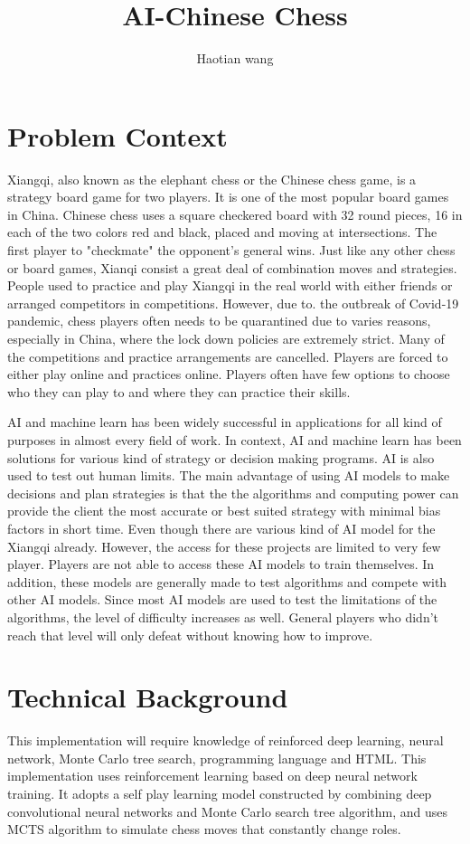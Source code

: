 \documentclass[10pt,twocolumn]{article}
\title{AI-Chinese Chess}
\author{Haotian wang}
\affiliation{Occidental College}
\begin{document}
\maketitle

\section{Problem Context}
    Xiangqi, also known as the elephant chess or the Chinese chess game, is a strategy board game for two players. It is one of the most popular board games in China. Chinese chess uses a square checkered board with 32 round pieces, 16 in each of the two colors red and black, placed and moving at intersections. The first player to "checkmate" the opponent's general wins. Just like any other chess or board games, Xianqi consist a great deal of combination moves and strategies. 
    People used to practice and play Xiangqi in the real world with either friends or arranged competitors in competitions. However, due to. the outbreak of Covid-19 pandemic, chess players often needs to be quarantined due to varies reasons, especially in China, where the lock down policies are extremely strict. Many of the competitions and practice arrangements are cancelled. Players are forced to either play online and practices online.  Players often have few options to choose who they can play to and where they can practice their skills. 
    
    AI and machine learn has been widely successful in applications for all kind of purposes in almost every field of work. In context, AI and machine learn has been solutions for various kind of strategy or decision making programs. AI is also used to test out human limits. The main advantage of using AI models to make decisions and plan strategies is that the the algorithms and computing power can provide the client the most accurate or best suited strategy with minimal bias factors in short time. Even though there are various kind of AI model for the Xiangqi already. However, the access for these projects are limited to very few player. Players are not able to access these AI models to train themselves. In addition, these models are generally made to test algorithms and compete with other AI models\cite{}. Since most AI models are used to test the limitations of the algorithms, the level of difficulty increases as well. General players who didn't reach that level will only defeat without knowing how to improve. 
    
\section{Technical Background}
	This implementation will require knowledge of reinforced deep learning, neural network, 
	Monte Carlo tree search, programming language and HTML. This implementation uses reinforcement learning based on deep neural network training. It adopts a self play learning model constructed by combining deep convolutional neural networks and Monte Carlo search tree algorithm, and uses MCTS algorithm to simulate chess moves that constantly change roles. 
	
\end{document}
